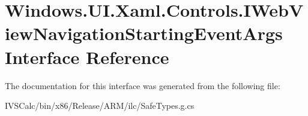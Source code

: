 \hypertarget{interface_windows_1_1_u_i_1_1_xaml_1_1_controls_1_1_i_web_view_navigation_starting_event_args}{}\section{Windows.\+U\+I.\+Xaml.\+Controls.\+I\+Web\+View\+Navigation\+Starting\+Event\+Args Interface Reference}
\label{interface_windows_1_1_u_i_1_1_xaml_1_1_controls_1_1_i_web_view_navigation_starting_event_args}


The documentation for this interface was generated from the following file\+:\begin{DoxyCompactItemize}
\item 
I\+V\+S\+Calc/bin/x86/\+Release/\+A\+R\+M/ilc/Safe\+Types.\+g.\+cs\end{DoxyCompactItemize}
